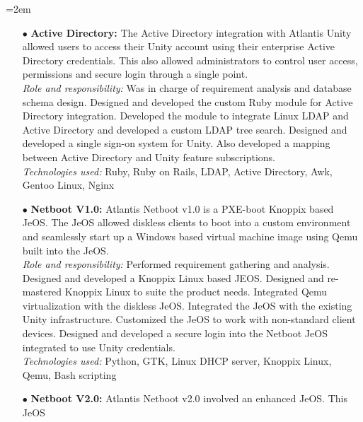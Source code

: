 \documentclass{scrartcl}
\newcommand{\MarginDate}[1]{\marginpar{\raggedleft\itshape\small#1}}
\newcommand{\Description}[1]{\hangindent=2em\hangafter=0\noindent\raggedright\footnotesize{#1}\par\normalsize}
\begin{document}
\begin{cv}{
\href{http://www.develmj.com}{}
}
\vspace{0.75em}

\Description{
\begin{itemize}
\item[\footnotesize$\bullet$] \textbf{Active
  Directory:}\MarginDate{Atlantis Unity} {\scriptsize The Active Directory integration with Atlantis
  Unity allowed users to access their Unity account using their enterprise Active
  Directory credentials. This also allowed administrators to control user access,
  permissions and secure login through a single point.}\\
  \vspace{0.5em}
  \textsl{Role and responsibility:} {\scriptsize Was in charge of requirement
    analysis and database schema design. Designed and developed the
    custom Ruby module for Active Directory integration. Developed the
    module to integrate Linux LDAP and Active Directory and developed
    a custom LDAP tree search. Designed and developed a single sign-on
    system for Unity. Also developed a mapping between Active
    Directory and Unity feature subscriptions.}\\
  \vspace{0.5em}
  \textsl{Technologies used:} {\scriptsize Ruby, Ruby on Rails, LDAP, Active Directory, Awk,
    Gentoo Linux, Nginx}
\item[\footnotesize$\bullet$] \textbf{Netboot V1.0:} {\scriptsize
  Atlantis Netboot v1.0 is a PXE-boot Knoppix based JeOS. The
  JeOS allowed diskless clients to boot into a custom environment and
  seamlessly start up a Windows based virtual machine image using Qemu
  built into the JeOS.}\\
  \vspace{0.5em}
  \textsl{Role and responsibility:} {\scriptsize Performed requirement gathering
  and analysis. Designed and developed a Knoppix Linux based
  JEOS. Designed and re-mastered Knoppix Linux to suite the product
  needs. Integrated Qemu virtualization with the diskless
  JeOS. Integrated the JeOS with the existing Unity
  infrastructure. Customized the JeOS to work with non-standard client
  devices. Designed and developed a secure login into the Netboot JeOS
  integrated to use Unity credentials.}\\
  \vspace{0.5em}
  \textsl{Technologies used:} {\scriptsize Python, GTK, Linux DHCP server, Knoppix Linux, Qemu,
    Bash scripting}
\item[\footnotesize$\bullet$] \textbf{Netboot V2.0:} {\scriptsize Atlantis Netboot v2.0 involved an enhanced JeOS. This JeOS
}
\end{itemize}}
\end{cv}
\end{document}

